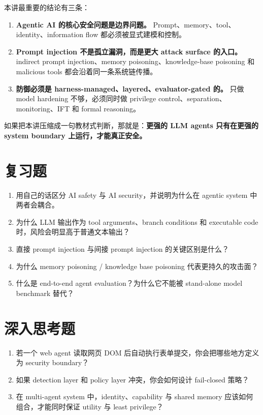 \documentclass[a4paper]{article}
\begin{document}
本讲最重要的结论有三条：

\begin{enumerate}
\item \textbf{Agentic AI 的核心安全问题是边界问题。} Prompt、memory、tool、identity、information flow 都必须被显式建模和控制。
\item \textbf{Prompt injection 不是孤立漏洞，而是更大 attack surface 的入口。} indirect prompt injection、memory poisoning、knowledge-base poisoning 和 malicious tools 都会沿着同一条系统链传播。
\item \textbf{防御必须是 harness-managed、layered、evaluator-gated 的。} 只做 model hardening 不够，必须同时做 privilege control、separation、monitoring、IFT 和 formal reasoning。
\end{enumerate}

如果把本讲压缩成一句教材式判断，那就是：\textbf{更强的 LLM agents 只有在更强的 system boundary 上运行，才能真正安全。}

\section{复习题}

\begin{enumerate}
\item 用自己的话区分 AI safety 与 AI security，并说明为什么在 agentic system 中两者会耦合。
\item 为什么 LLM 输出作为 tool arguments、branch conditions 和 executable code 时，风险会明显高于普通文本输出？
\item 直接 prompt injection 与间接 prompt injection 的关键区别是什么？
\item 为什么 memory poisoning / knowledge base poisoning 代表更持久的攻击面？
\item 什么是 end-to-end agent evaluation？为什么它不能被 stand-alone model benchmark 替代？
\end{enumerate}

\section{深入思考题}

\begin{enumerate}
\item 若一个 web agent 读取网页 DOM 后自动执行表单提交，你会把哪些地方定义为 security boundary？
\item 如果 detection layer 和 policy layer 冲突，你会如何设计 fail-closed 策略？
\item 在 multi-agent system 中，identity、capability 与 shared memory 应该如何组合，才能同时保证 utility 与 least privilege？
\end{enumerate}
\end{document}
